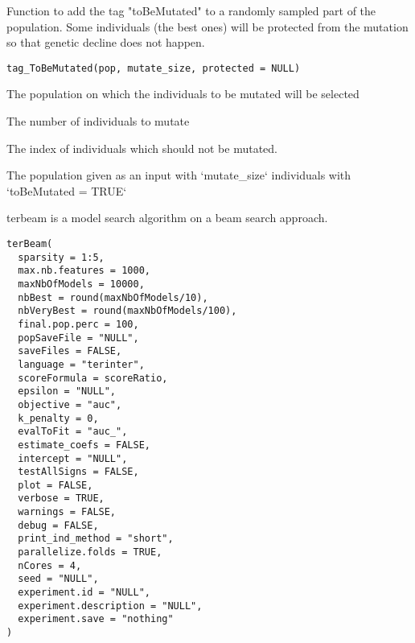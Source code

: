 \documentclass[a4paper]{book}
\begin{document}
%
\begin{Description}
Function to add the tag "toBeMutated" to a randomly sampled part of 
the population. Some individuals (the best ones) will be protected from the mutation
so that genetic decline does not happen.
\end{Description}
%
\begin{Usage}
\begin{verbatim}
tag_ToBeMutated(pop, mutate_size, protected = NULL)
\end{verbatim}
\end{Usage}
%
\begin{Arguments}
\begin{ldescription}
\item[\code{pop:}] The population on which the individuals to be mutated will be selected

\item[\code{mutate\_size:}] The number of individuals to mutate

\item[\code{protected:}] The index of individuals which should not be mutated.
\end{ldescription}
\end{Arguments}
%
\begin{Value}
The population given as an input with `mutate\_size` individuals with `toBeMutated = TRUE`
\end{Value}
%
\begin{Description}
terbeam is a model search algorithm on a beam search approach.
\end{Description}
%
\begin{Usage}
\begin{verbatim}
terBeam(
  sparsity = 1:5,
  max.nb.features = 1000,
  maxNbOfModels = 10000,
  nbBest = round(maxNbOfModels/10),
  nbVeryBest = round(maxNbOfModels/100),
  final.pop.perc = 100,
  popSaveFile = "NULL",
  saveFiles = FALSE,
  language = "terinter",
  scoreFormula = scoreRatio,
  epsilon = "NULL",
  objective = "auc",
  k_penalty = 0,
  evalToFit = "auc_",
  estimate_coefs = FALSE,
  intercept = "NULL",
  testAllSigns = FALSE,
  plot = FALSE,
  verbose = TRUE,
  warnings = FALSE,
  debug = FALSE,
  print_ind_method = "short",
  parallelize.folds = TRUE,
  nCores = 4,
  seed = "NULL",
  experiment.id = "NULL",
  experiment.description = "NULL",
  experiment.save = "nothing"
)
\end{verbatim}
\end{Usage}
\end{document}
